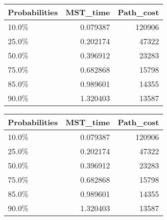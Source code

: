 \begin{tabular}{lrr}
\toprule
Probabilities &  MST\_time &  Path\_cost \\
\midrule
        10.0\% &  0.079387 &     120906 \\
        25.0\% &  0.202174 &      47322 \\
        50.0\% &  0.396912 &      23283 \\
        75.0\% &  0.682868 &      15798 \\
        85.0\% &  0.989601 &      14355 \\
        90.0\% &  1.320403 &      13587 \\
\bottomrule
\end{tabular}
\begin{tabular}{|l|r|r|}
\toprule \hline
Probabilities &  MST\_time &  Path\_cost \\ \hline

\midrule
        10.0\% &  0.079387 &     120906 \\ \hline

        25.0\% &  0.202174 &      47322 \\ \hline

        50.0\% &  0.396912 &      23283 \\ \hline

        75.0\% &  0.682868 &      15798 \\ \hline

        85.0\% &  0.989601 &      14355 \\ \hline

        90.0\% &  1.320403 &      13587 \\ \hline

\bottomrule
\end{tabular}
